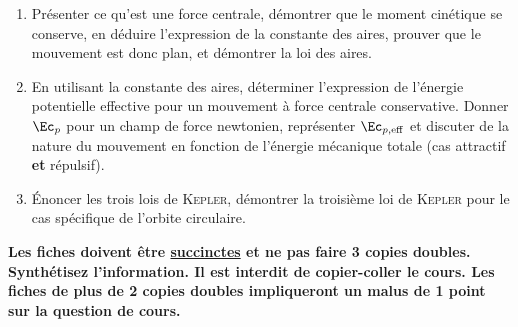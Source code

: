 \documentclass[a4paper, 12pt, final, garamond]{book}
\begin{document}
\begin{enumerate}[label=\sqenumi]
    \item Présenter ce qu'est une force centrale, démontrer que le moment
        cinétique se conserve, en déduire l'expression de la constante des
        aires, prouver que le mouvement est donc plan, et démontrer la loi des
        aires.
    \item En utilisant la constante des aires, déterminer l'expression de
        l'énergie potentielle effective pour un mouvement à force centrale
        conservative. Donner $\Ec_p$ pour un champ de force newtonien, 
        représenter $\Ec_{p,\rm eff}$ et discuter de la nature du mouvement en
        fonction de l'énergie mécanique totale (cas attractif \textbf{et}
        répulsif).
    \item Énoncer les trois lois de \textsc{Kepler}, démontrer la troisième loi
        de \textsc{Kepler} pour le cas spécifique de l'orbite circulaire.
\end{enumerate}
\vspace{-5pt}
\begin{framed}
    \centering\bfseries\large
    Les fiches doivent être \ul{succinctes} et ne pas faire 3 copies doubles.
    Synthétisez l'information. Il est interdit de copier-coller le cours.
    \bigbreak
    \Huge
    Les fiches de plus de 2 copies doubles impliqueront un malus de 1 point sur
    la question de cours.
\end{framed}
\end{document}
